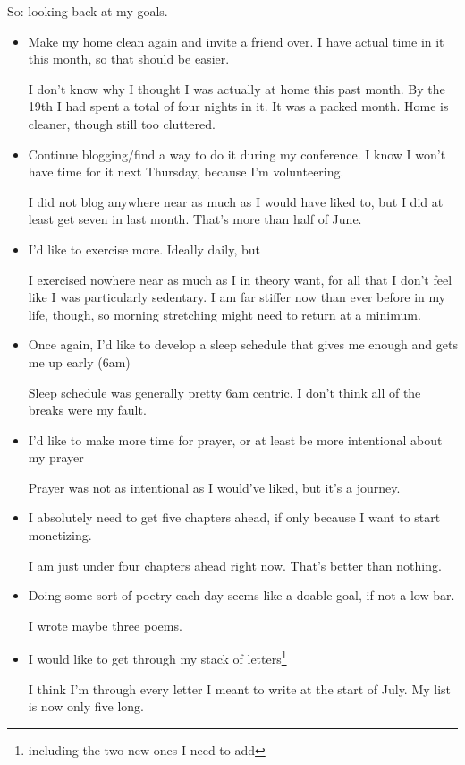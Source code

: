 \documentclass[12pt]{article}[titlepage]
\renewcommand{\,}{\textsuperscript{,}}
\begin{document}
So: looking back at my goals.
\begin{itemize}
\item Make my home clean again and invite a friend over. I have actual time in it this month, so that should be easier.

I don't know why I thought I was actually at home this past month. By the 19th I had spent a total of four nights in it. It was a packed month.
Home is cleaner, though still too cluttered.
\item Continue blogging/find a way to do it during my conference. I know I won't have time for it next Thursday, because I'm volunteering.

I did not blog anywhere near as much as I would have liked to, but I did at least get seven in last month. That's more than half of June.
\item I'd like to exercise more. Ideally daily, but

I exercised nowhere near as much as I in theory want, for all that I don't feel like I was particularly sedentary. I am far stiffer now than ever before in my life, though, so morning stretching might need to return at a minimum.
\item Once again, I'd like to develop a sleep schedule that gives me enough and gets me up early (6am)

Sleep schedule was generally pretty 6am centric. I don't think all of the breaks were my fault.
\item I'd like to make more time for prayer, or at least be more intentional about my prayer

Prayer was not as intentional as I would've liked, but it's a journey.
\item I absolutely need to get five chapters ahead, if only because I want to start monetizing.

I am just under four chapters ahead right now. That's better than nothing.
\item Doing some sort of poetry each day seems like a doable goal, if not a low bar.

I wrote maybe three poems.
\item I would like to get through my stack of letters\footnote{including the two new ones I need to add}

I think I'm through every letter I meant to write at the start of July.
My list is now only five long.
\end{itemize}
\end{document}
